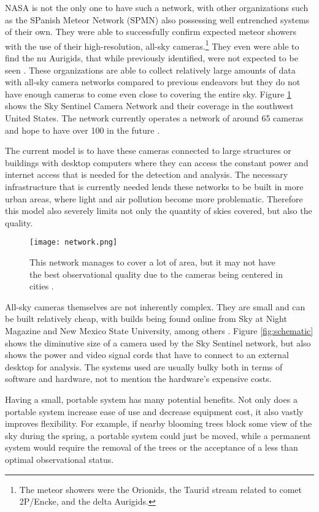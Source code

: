 NASA is not the only one to have such a network, with other organizations such as the SPanish Meteor Network (SPMN) also possessing well entrenched systems of their own. They were  able to successfully confirm expected meteor showers with the use of their high-resolution, all-sky cameras.\footnote{The meteor showers were the Orionids, the Taurid stream related to comet 2P/Encke, and the delta Aurigids.} They even were able to find the nu Aurigids, that while previously identified, were not expected to be seen \cite{Trigo-Rodriguez2007}. These organizations are able to collect relatively large amounts of data with all-sky camera networks compared to previous endeavors but they do not have enough cameras to come even close to covering the entire sky. Figure \ref{fig:network} shows the Sky Sentinel Camera Network and their coverage in the southwest United States. The network currently operates a network of around 65 cameras and hope to have over 100 in the future \cite{Bannister2012}.

The current model is to have these cameras connected to large structures or buildings with desktop computers where they can access the constant power and internet access that is needed for the detection and analysis. The necessary infrastructure that is currently needed lends these networks to be built in more urban areas, where light and air pollution become more problematic. Therefore this  model also severely limits not only the quantity of skies covered, but also the quality.

\begin{figure}[ht!]
	\centering
	\texttt{[image: network.png]}
	\caption{This network manages to cover a lot of area, but it may not have the best observational quality due to the cameras being centered in cities \protect\cite{SkySentinel}.}
	\label{fig:network}
\end{figure}

All-sky cameras themselves are not inherently complex. They are small and can be built relatively cheap, with builds being found online from Sky at Night Magazine and New Mexico State University, among others \cite{Bannister2012}. Figure \ref{fig:schematic} shows the diminutive size of a camera used by the Sky Sentinel network, but also shows the power and video signal cords that have to connect to an external desktop for analysis. The systems used are usually bulky both in terms of software and hardware, not to mention the hardware's expensive costs.

Having a small, portable system has many potential benefits. Not only does a portable system increase ease of use and decrease equipment cost, it also vastly improves flexibility. For example, if nearby blooming trees block some view of the sky during the spring, a portable system could just be moved, while a permanent system would require the removal of the trees or the acceptance of a less than optimal observational status.


